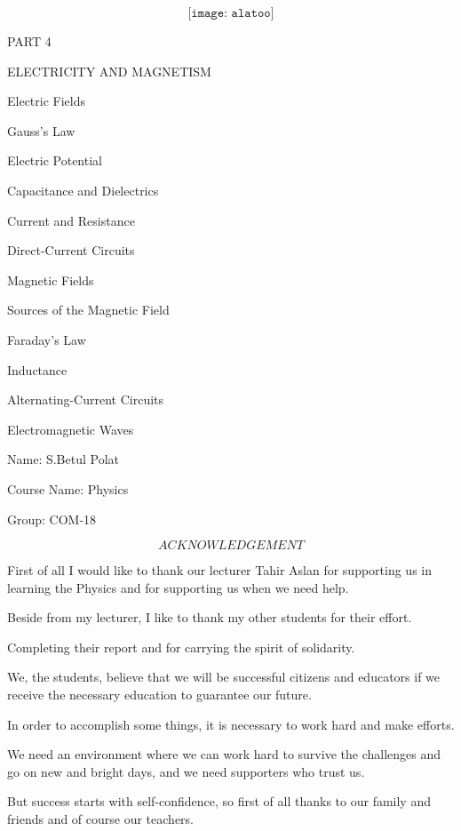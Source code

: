 \documentclass[11pt] {article}
\begin{document}
$$\texttt{[image: alatoo]}$$

\vspace{5mm} %
\begin{center}
PART 4

ELECTRICITY AND  MAGNETISM         
                 
Electric Fields 

Gauss’s Law

Electric Potential

Capacitance and Dielectrics

Current and Resistance

Direct-Current Circuits

Magnetic Fields

Sources of the Magnetic Field

Faraday’s Law

Inductance

Alternating-Current Circuits

Electromagnetic Waves

\end{center}
\vspace{5mm} %
\hfill Name: S.Betul Polat

\hfill Course Name: Physics

\hfill Group: COM-18

\vspace{25mm} %
							$$ACKNOWLEDGEMENT$$

First of all I would like to thank our lecturer Tahir Aslan for supporting  us in learning the Physics and for supporting us when we need help.

Beside from my lecturer, I like to thank my other students for their effort.

Completing their report and for carrying the spirit of solidarity.

We, the students, believe that we will be successful citizens and educators if we receive the necessary education to guarantee our future.

In order to accomplish some things, it is necessary to work hard and make efforts. 

We need an environment where we can work hard to survive the challenges and go on new and bright days, and we need supporters who trust us. 

But success starts with self-confidence, so first of all thanks to our family and friends and of course our teachers.
\end{document}
